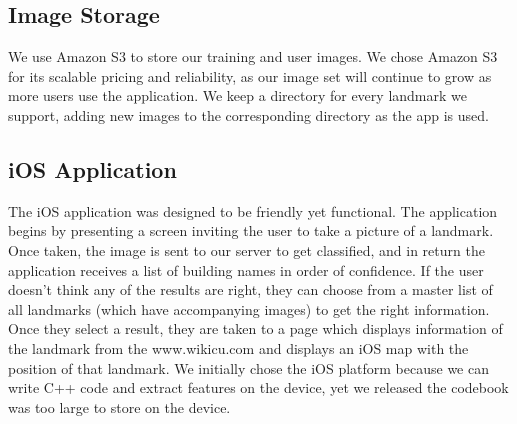 \subsection{Image Storage}
We use Amazon S3 to store our training and user images. We chose Amazon S3 for its scalable pricing and reliability, as our image set will continue to grow as more users use the application. We keep a directory for every landmark we support, adding new images to the corresponding directory as the app is used. 

\subsection{iOS Application}
The iOS application was designed to be friendly yet functional. The application begins by presenting a screen inviting the user to take a picture of a landmark. Once taken, the image is sent to our server to get classified, and in return the application receives a list of building names in order of confidence. If the user doesn't think any of the results are right, they can choose from a master list of all landmarks (which have accompanying images) to get the right information. Once they select a result, they are taken to a page which displays information of the landmark from the www.wikicu.com and displays an iOS map with the position of that landmark. We initially chose the iOS platform because we can write C++ code and extract features on the device, yet we released the codebook was too large to store on the device.